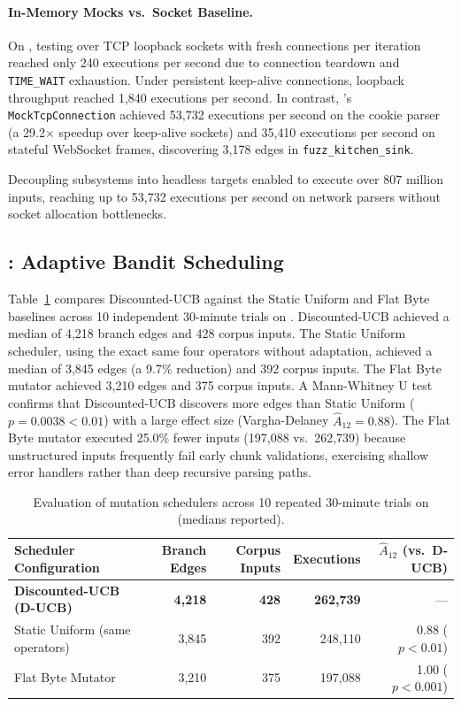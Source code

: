 \paragraph{In-Memory Mocks vs.\ Socket Baseline.}
On \drogon, testing over TCP loopback sockets with fresh connections per iteration reached only 240 executions per second due to connection teardown and \texttt{TIME\_WAIT} exhaustion.
Under persistent keep-alive connections, loopback throughput reached 1{,}840 executions per second.
In contrast, \tool's \texttt{MockTcpConnection} achieved 53{,}732 executions per second on the cookie parser (a 29.2$\times$ speedup over keep-alive sockets) and 35{,}410 executions per second on stateful WebSocket frames, discovering 3{,}178 edges in \texttt{fuzz\_kitchen\_sink}.

\begin{observation}
\label{obs:throughput}
Decoupling subsystems into headless targets enabled \tool to execute over 807 million inputs, reaching up to 53{,}732 executions per second on network parsers without socket allocation bottlenecks.
\end{observation}

\subsection{: Adaptive Bandit Scheduling}
\label{sec:rq2}

Table~\ref{tab:bandit_cmp} compares Discounted-UCB against the Static Uniform and Flat Byte baselines across 10 independent 30-minute trials on \fastgltf.
Discounted-UCB achieved a median of 4{,}218 branch edges and 428 corpus inputs.
The Static Uniform scheduler, using the exact same four operators without adaptation, achieved a median of 3{,}845 edges (a 9.7\% reduction) and 392 corpus inputs.
The Flat Byte mutator achieved 3{,}210 edges and 375 corpus inputs.
A Mann-Whitney U test confirms that Discounted-UCB discovers more edges than Static Uniform ($p = 0.0038 < 0.01$) with a large effect size (Vargha-Delaney $\hat{A}_{12} = 0.88$).
The Flat Byte mutator executed 25.0\% fewer inputs (197{,}088 vs.\ 262{,}739) because unstructured inputs frequently fail early chunk validations, exercising shallow error handlers rather than deep recursive parsing paths.

\begin{table}[t]
  \caption{Evaluation of mutation schedulers across 10 repeated 30-minute trials on \fastgltf (medians reported).}
  \label{tab:bandit_cmp}
  \footnotesize
  \begin{tabular}{lrrrr}
    \toprule
    Scheduler Configuration & Branch Edges & Corpus Inputs & Executions & $\hat{A}_{12}$ (vs.\ D-UCB) \\
    \midrule
    \textbf{Discounted-UCB (D-UCB)} & \textbf{4{,}218} & \textbf{428} & \textbf{262{,}739} & --- \\
    Static Uniform (same operators) & 3{,}845 & 392 & 248{,}110 & 0.88 ($p < 0.01$) \\
    Flat Byte Mutator               & 3{,}210 & 375 & 197{,}088 & 1.00 ($p < 0.001$) \\
    \bottomrule
  \end{tabular}
\end{table}

